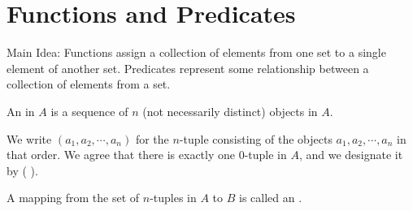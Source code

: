 
\newpage

\section{Functions and Predicates}

Main Idea: Functions assign a collection of elements from one set 
to a single element of another set. Predicates represent some 
relationship between a collection of elements from a set.

\begin{definition}[$n$-tuple]
	An  in $A$ is a sequence 
	of $n$ (not necessarily	distinct) objects in $A$.
\end{definition}

We write $(a_1, a_2, \cdots, a_n)$ for the $n$-tuple consisting of 
the objects $a_1, a_2, \cdots, a_n$ in that order. We agree that 
there is exactly one 0-tuple in $A$, and we designate it by ( ).

\begin{definition}[Functions]
	A mapping from the set of $n$-tuples in $A$ to $B$ is called an 
	.
\end{definition}

